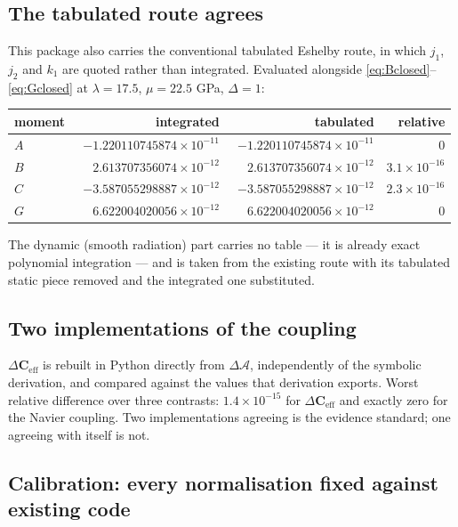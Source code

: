\documentclass[11pt,a4paper]{article}
\newcommand{\dA}{\Delta\mathcal{A}}
\newcommand{\dCeff}{\Delta\mathbf{C}_{\mathrm{eff}}}
\begin{document}
\subsection{The tabulated route agrees}

This package also carries the conventional tabulated Eshelby route, in which
$j_1$, $j_2$ and $k_1$ are quoted rather than integrated.  Evaluated alongside
\eqref{eq:Bclosed}--\eqref{eq:Gclosed} at $\lambda = 17.5$, $\mu = 22.5$ GPa,
$\Delta = 1$:

\begin{center}
\begin{tabular}{lrrr}
\toprule
moment & integrated & tabulated & relative\\
\midrule
$A$ & $-1.220110745874\times10^{-11}$ & $-1.220110745874\times10^{-11}$ & $0$\\
$B$ & $\phantom{-}2.613707356074\times10^{-12}$ & $\phantom{-}2.613707356074\times10^{-12}$ & $3.1\times10^{-16}$\\
$C$ & $-3.587055298887\times10^{-12}$ & $-3.587055298887\times10^{-12}$ & $2.3\times10^{-16}$\\
$G$ & $\phantom{-}6.622004020056\times10^{-12}$ & $\phantom{-}6.622004020056\times10^{-12}$ & $0$\\
\bottomrule
\end{tabular}
\end{center}

The dynamic (smooth radiation) part carries no table --- it is already exact
polynomial integration --- and is taken from the existing route with its
tabulated static piece removed and the integrated one substituted.

\subsection{Two implementations of the coupling}

$\dCeff$ is rebuilt in Python directly from $\dA$, independently of the symbolic
derivation, and compared against the values that derivation exports.  Worst
relative difference over three contrasts: $1.4\times10^{-15}$ for $\dCeff$ and
exactly zero for the Navier coupling.  Two implementations agreeing is the
evidence standard; one agreeing with itself is not.

\subsection{Calibration: every normalisation fixed against existing code}
\label{sec:calibration}
\end{document}

